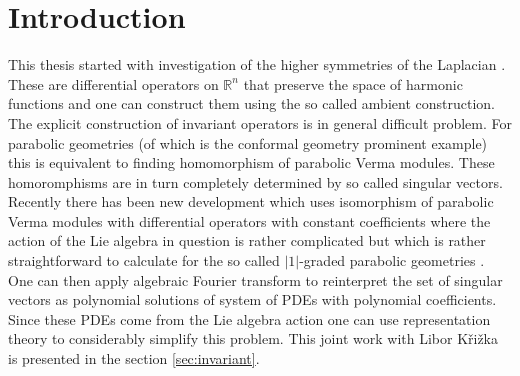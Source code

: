 \chapter*{Introduction}

This thesis started with investigation of the higher symmetries of the Laplacian \cite{eastwood_higher_2005, tucek_construction_2011}. These are differential operators on $\mathbb{R}^n$ that preserve the space of harmonic functions and one can construct them using the so called ambient construction. The explicit construction of invariant operators is in general difficult problem. For parabolic geometries (of which is the conformal geometry prominent example) this is equivalent to finding homomorphism of parabolic Verma modules. These homoromphisms are in turn completely determined by so called singular vectors. Recently there has been new development which uses isomorphism of parabolic Verma modules with differential operators with constant coefficients where the action of the Lie algebra in question is rather complicated \cite{krizka_invariant_2017} but which is rather straightforward to calculate for the so called $|1|$-graded parabolic geometries \cite{kobayashi_branching_2015}. One can then apply algebraic Fourier transform to reinterpret the set of singular vectors as polynomial solutions of system of PDEs with polynomial coefficients. Since these PDEs come from the Lie algebra action one can use representation theory to considerably simplify this problem. This joint work with Libor Křižka is presented in the section \ref{sec:invariant}. 

